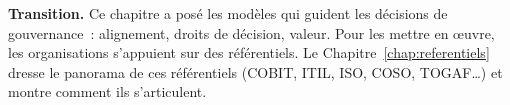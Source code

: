 \bigskip

\begin{boxinfo}
\textbf{Transition.} Ce chapitre a posé les modèles qui guident les
décisions de gouvernance~: alignement, droits de décision, valeur. Pour
les mettre en œuvre, les organisations s'appuient sur des référentiels.
Le Chapitre~\ref{chap:referentiels} dresse le panorama de ces
référentiels (COBIT, ITIL, ISO, COSO, TOGAF\ldots) et montre comment ils
s'articulent.
\end{boxinfo}
